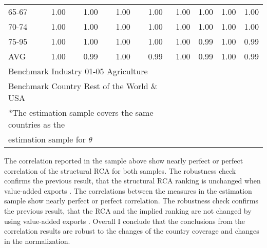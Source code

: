 \begin{table}[H]
{\begin{minipage}{\textwidth}
\begin{tabular}{l*{8}{c}}
  65-67 & 1.00 & 1.00 & 1.00 & 1.00 & 1.00 & 1.00 & 1.00 & 1.00 \\ 
  70-74 & 1.00 & 1.00 & 1.00 & 1.00 & 1.00 & 1.00 & 1.00 & 1.00 \\ 
  75-95 & 1.00 & 1.00 & 1.00 & 1.00 & 1.00 & 0.99 & 1.00 & 0.99 \\ \midrule
  AVG & 1.00 & 0.99 & 1.00 & 0.99 & 1.00 & 0.99 & 1.00 & 0.99 \\ 
   \bottomrule
   \multicolumn{5}{l}{Benchmark Industry 01-05 Agriculture}\\
\multicolumn{5}{l}{Benchmark Country Rest of the World \&  USA}\\
 \multicolumn{5}{l}{*The estimation sample covers the same countries as the} \\
 \multicolumn{5}{l}{estimation sample for $\theta$}
  \end{tabular}
      \end{minipage}}
\end{table}
The correlation reported in the sample above show nearly perfect or perfect correlation of the structural RCA for both samples. The robustness check confirms the previous result, that the structural RCA ranking is unchanged when value-added exports .    %
 The correlations between the measures in the estimation sample show nearly perfect or perfect correlation. The robustness check confirms the previous result, that the RCA and the implied ranking are not changed by using value-added exports .
Overall I conclude that the conclusions from the correlation results are robust to the changes of the country coverage and changes in the normalization.
